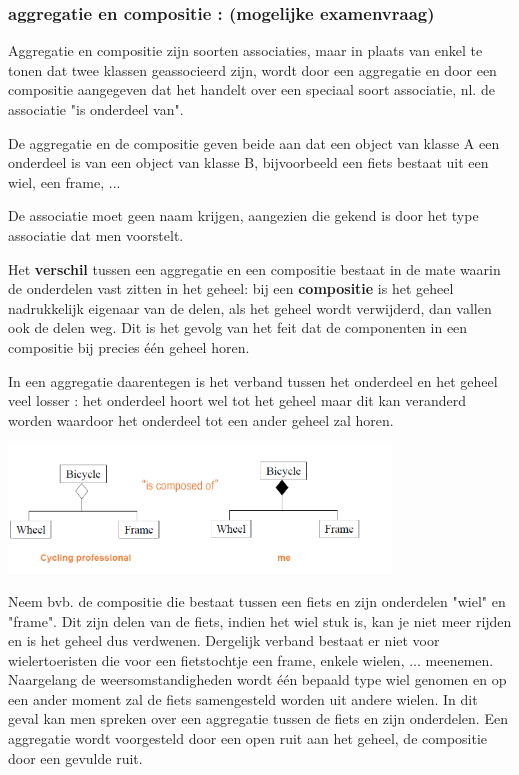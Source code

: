 \newpage

\subsubsection{aggregatie en compositie : (mogelijke examenvraag)}

Aggregatie en compositie zijn soorten associaties, maar in plaats van enkel te tonen dat twee klassen geassocieerd zijn, wordt door een aggregatie en door een compositie aangegeven dat het handelt over een speciaal soort associatie, nl. de associatie "is onderdeel van".

De aggregatie en de compositie geven beide aan dat een object van klasse A een onderdeel is van een object van klasse B, bijvoorbeeld een fiets bestaat uit een wiel, een frame, ...

De associatie moet geen naam krijgen, aangezien die gekend is door het type associatie dat men voorstelt.

Het \textbf{verschil} tussen een aggregatie en een compositie bestaat in de mate waarin de onderdelen vast zitten in het geheel: bij een \textbf{compositie} is het geheel nadrukkelijk eigenaar van de delen, als het geheel wordt verwijderd, dan vallen ook de delen weg. Dit is het gevolg van het feit dat de componenten in een compositie bij precies één geheel horen.

In een aggregatie daarentegen is het verband tussen het onderdeel en het
geheel veel losser : het onderdeel hoort wel tot het geheel maar dit kan veranderd worden waardoor het onderdeel tot een ander geheel zal horen.


\begin{center}
\includegraphics[width=4in]{img/aggcom}%
\end{center}

Neem bvb. de compositie die bestaat tussen een fiets en zijn onderdelen "wiel" en "frame". Dit zijn delen van de fiets, indien het wiel stuk is, kan je niet meer rijden en is het geheel dus verdwenen.
Dergelijk verband bestaat er niet voor wielertoeristen die voor een fietstochtje een frame, enkele wielen, ... meenemen. Naargelang de weersomstandigheden wordt één bepaald type wiel genomen en op een ander moment zal de fiets samengesteld worden uit andere wielen. In dit geval kan men spreken over een aggregatie tussen de fiets en zijn onderdelen.
Een aggregatie wordt voorgesteld door een open ruit aan het geheel, de compositie door een gevulde ruit.

